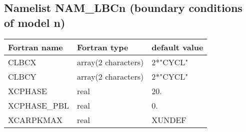 \subsection{Namelist NAM\_LBCn (boundary conditions of model n)}

\begin{center}
\begin{tabular} {|l|l|l|}
\hline
Fortran name & Fortran type & default value \\
\hline
CLBCX        &  array(2 characters) & 2*"CYCL" \\
CLBCY        &  array(2 characters) & 2*"CYCL" \\
XCPHASE      & real                 &  20.     \\
XCPHASE\_PBL & real                 &  0.      \\
XCARPKMAX    & real                 &  XUNDEF  \\
\hline
\end{tabular}
\end{center}

